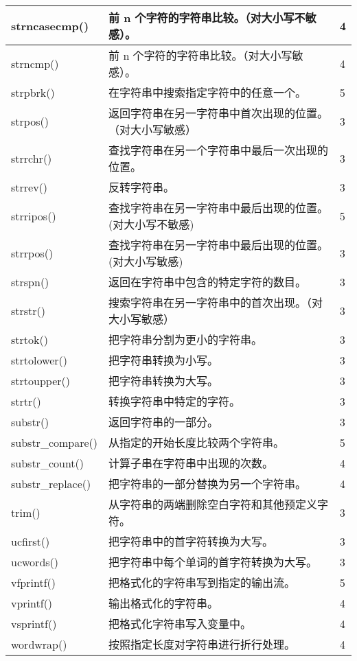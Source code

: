 \begin{longtable}{|m{120pt}|m{250pt}|m{20pt}|}
\hline
strncasecmp()				&前 n 个字符的字符串比较。\newline（对大小写不敏感）。	&4\\
\hline
strncmp()					&前 n 个字符的字符串比较。\newline（对大小写敏感）。&	4\\
\hline
strpbrk()					&在字符串中搜索指定字符中的任意一个。	&5\\
\hline
strpos()					&返回字符串在另一字符串中首次出现的位置。\newline（对大小写敏感）&	3\\
\hline
strrchr()					&查找字符串在另一个字符串中最后一次出现的位置。	&3\\
\hline
strrev()						&反转字符串。	&3\\
\hline
strripos()					&查找字符串在另一字符串中最后出现的位置。\newline (对大小写不敏感)	&5\\
\hline
strrpos()					&查找字符串在另一字符串中最后出现的位置。\newline (对大小写敏感)	&3\\
\hline
strspn()						&返回在字符串中包含的特定字符的数目。	&3\\
\hline
strstr()						&搜索字符串在另一字符串中的首次出现。\newline（对大小写敏感）	&3\\
\hline
strtok()						&把字符串分割为更小的字符串。	&3\\
\hline
strtolower()				&把字符串转换为小写。	&3\\
\hline
strtoupper()				&把字符串转换为大写。&	3\\
\hline
strtr()						&转换字符串中特定的字符。&	3\\
\hline
substr()						&返回字符串的一部分。	&3\\
\hline
substr\_compare()			&从指定的开始长度比较两个字符串。	&5\\
\hline
substr\_count()				&计算子串在字符串中出现的次数。	&4\\
\hline
substr\_replace()			&把字符串的一部分替换为另一个字符串。&	4\\
\hline
trim()						&从字符串的两端删除空白字符和其他预定义字符。&	3\\
\hline
ucfirst()						&把字符串中的首字符转换为大写。	&3\\
\hline
ucwords()					&把字符串中每个单词的首字符转换为大写。&	3\\
\hline
vfprintf()					&把格式化的字符串写到指定的输出流。	&5\\
\hline
vprintf()					&输出格式化的字符串。	&4\\
\hline
vsprintf()					&把格式化字符串写入变量中。&	4\\
\hline
wordwrap()					&按照指定长度对字符串进行折行处理。&	4\\
\hline
\end{longtable}


